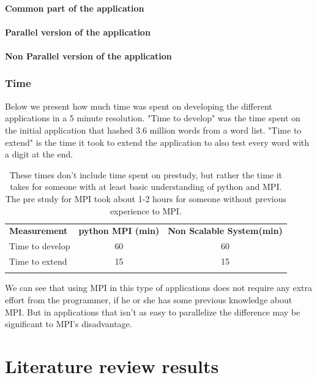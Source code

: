 \documentclass{article}
\begin{document}
\paragraph{Common part of the application}
{\small}
\paragraph{Parallel version of the application}
{\small}
\newpage
\paragraph{Non Parallel version of the application}
{\small}

\subsubsection{Time}
Below we present how much time was spent on developing the different
applications in a 5 minute resolution. "Time to develop" was the time spent on
the initial application that hashed 3.6 million words from a word list. "Time
to extend" is the time it took to extend the application to also test every
word with a digit at the end.

\begin{table}[h!]
\begin{tabular}{l c c}
  \rowcolor[gray]{0.5}
  {\bf Measurement} & {\bf python MPI (min)} & {\bf Non Scalable System(min)} \\
  Time to develop &  60  &  60 \\
  Time to extend   &   15  &  15  \\
\rowcolor[gray]{0.5}
\end{tabular}
\caption{ These times don't include time spent on prestudy, but rather the time
it takes for someone with at least basic understanding of python and MPI. The
pre study for MPI took about 1-2 hours for someone without previous experience
to MPI.}
\end{table}

We can see that using MPI in this type of applications does not require any
extra effort from the programmer, if he or she has some previous knowledge
about MPI.  But in applications that isn't as easy to parallelize the
difference may be significant to MPI's disadvantage.

 
\section{Literature review results}
\end{document}
